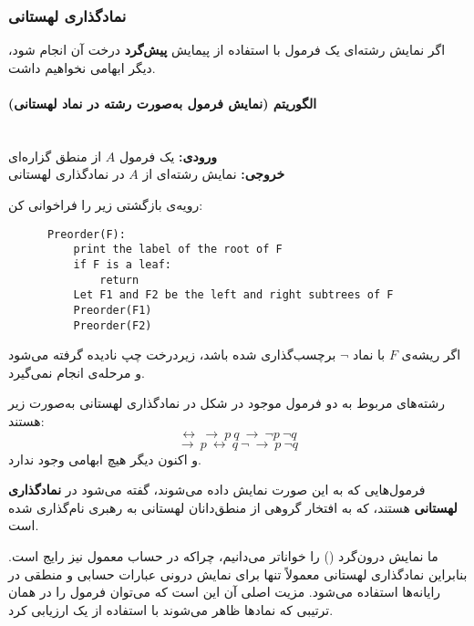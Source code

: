    \subsubsection*{نمادگذاری لهستانی }
 
    اگر نمایش رشته‌ای یک فرمول با استفاده از پیمایش \textbf{پیش‌گرد}  درخت آن انجام شود، دیگر ابهامی نخواهیم داشت.
 
    \paragraph{الگوریتم  (نمایش فرمول به‌صورت رشته در نماد لهستانی)} \hfill \\
    \textbf{ورودی:} یک فرمول $A$ از منطق گزاره‌ای \\
    \textbf{خروجی:} نمایش رشته‌ای از $A$ در نمادگذاری لهستانی
 
    رویه‌ی بازگشتی زیر را فراخوانی کن: 
 
    \begin{latin}
      \begin{verbatim}
      Preorder(F):
          print the label of the root of F
          if F is a leaf:
              return
          Let F1 and F2 be the left and right subtrees of F
          Preorder(F1)
          Preorder(F2)
      \end{verbatim}
    \end{latin}
 
    اگر ریشه‌ی $F$ با نماد $\neg$ برچسب‌گذاری شده باشد، زیر‌درخت چپ نادیده گرفته می‌شود و مرحله‌ی  انجام نمی‌گیرد.
 
    \begin{example}[مثال \lr{2.9}] رشته‌های مربوط به دو فرمول موجود در شکل  در نمادگذاری لهستانی به‌صورت زیر هستند:
      \[
      \leftrightarrow\ \rightarrow\ p\ q\ \rightarrow\ \neg p\ \neg q
      \]
      \[
      \rightarrow\ p\ \leftrightarrow\ q\ \neg\ \rightarrow\ p\ \neg q
      \]
    و اکنون دیگر هیچ ابهامی وجود ندارد.
    \end{example}
    فرمول‌هایی که به این صورت نمایش داده می‌شوند، گفته می‌شود در \textbf{نمادگذاری لهستانی} هستند، که به افتخار گروهی از منطق‌دانان لهستانی به رهبری  نام‌گذاری شده است.
 
    ما نمایش درون‌گرد () را خواناتر می‌دانیم، چراکه در حساب معمول نیز رایج است. بنابراین نمادگذاری لهستانی معمولاً تنها برای نمایش درونی عبارات حسابی و منطقی در رایانه‌ها استفاده می‌شود. مزیت اصلی آن این است که می‌توان فرمول را در همان ترتیبی که نمادها ظاهر می‌شوند با استفاده از یک  ارزیابی کرد.
 
